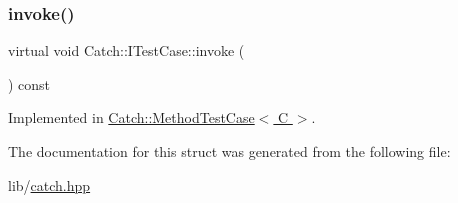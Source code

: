 \subsubsection{\texorpdfstring{invoke()}{invoke()}}
{\footnotesize\ttfamily virtual void Catch\+::\+I\+Test\+Case\+::invoke (\begin{DoxyParamCaption}{ }\end{DoxyParamCaption}) const\hspace{0.3cm}{\ttfamily [pure virtual]}}



Implemented in \hyperlink{class_catch_1_1_method_test_case_a4e2263cfa0646f2980768328cb372793}{Catch\+::\+Method\+Test\+Case$<$ C $>$}.



The documentation for this struct was generated from the following file\+:\begin{DoxyCompactItemize}
\item 
lib/\hyperlink{catch_8hpp}{catch.\+hpp}\end{DoxyCompactItemize}
